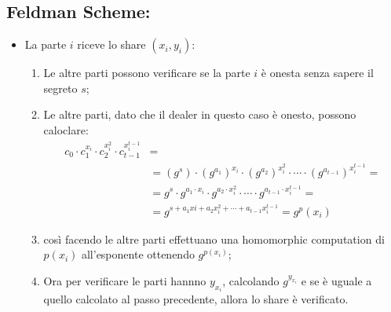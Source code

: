 \documentclass{book}
\begin{document}
\subsection{Feldman Scheme:\@verifier}
\begin{itemize}
    \item La parte \(i\) riceve lo share \((x_{i},y_{i})\):\begin{enumerate}
              \item Le altre parti possono verificare se la parte \(i\) è onesta senza sapere il segreto \(s\);
              \item Le altre parti, dato che il dealer in questo caso è onesto, possono caloclare:\begin{align*}
                        c_{0}\cdot c_{1}^{x_i}\cdot c_{2}^{x_{i}^{2}}\cdot c_{t-1}^{x_{i}^{t-1}} & =                                                                                                           \\                                                       & =(g^{s})\cdot {(g^{a_{1}})}^{x_{i}}\cdot {(g^{a_{2}})}^{x_{i}^2}\cdot\cdots\cdot {(g^{a_{t-1}})}^{x_{i}^{t-1}}= \\
                                                                                                 & = g^{s}\cdot g^{a_{1}\cdot x_{i}}\cdot g^{a_{2}\cdot x_{i}^2}\cdot\cdots\cdot g^{a_{t-1}\cdot x_{i}^{t-1}}= \\
                                                                                                 & = g^{s+a_{1}x{i}+a_{2}x_{i}^2+\cdots +a_{t-1}x_{i}^{t-1}}=g^p(x_{i})
                    \end{align*}
              \item così facendo le altre parti effettuano una homomorphic computation di \(p(x_{i})\) all'esponente ottenendo \(g^{p(x_{i})}\);
              \item Ora per verificare le parti hannno \(y_{x_{i}}\), calcolando \(g^{y_{x_{i}}}\) e se è uguale a quello calcolato al passo precedente, allora lo share è verificato\@.
          \end{enumerate}
\end{itemize}
\end{document}
